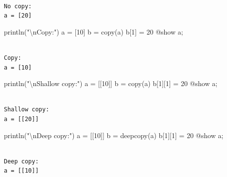\documentclass[
]{article}
\newenvironment{Shaded}{\begin{snugshade}}{\end{snugshade}}
\newcommand{\FloatTok}[1]{\textcolor[rgb]{0.68,0.00,0.00}{#1}}
\newcommand{\FunctionTok}[1]{\textcolor[rgb]{0.28,0.35,0.67}{#1}}
\newcommand{\NormalTok}[1]{\textcolor[rgb]{0.00,0.23,0.31}{#1}}
\newcommand{\OperatorTok}[1]{\textcolor[rgb]{0.37,0.37,0.37}{#1}}
\newcommand{\PreprocessorTok}[1]{\textcolor[rgb]{0.68,0.00,0.00}{#1}}
\newcommand{\SpecialCharTok}[1]{\textcolor[rgb]{0.37,0.37,0.37}{#1}}
\newcommand{\StringTok}[1]{\textcolor[rgb]{0.13,0.47,0.30}{#1}}
\begin{document}
\begin{verbatim}

No copy:
a = [20]
\end{verbatim}

\begin{Shaded}
\begin{Highlighting}[]
\FunctionTok{println}\NormalTok{(}\StringTok{"}\SpecialCharTok{\textbackslash{}n}\StringTok{Copy:"}\NormalTok{)}
\NormalTok{a }\OperatorTok{=}\NormalTok{ [}\FloatTok{10}\NormalTok{]}
\NormalTok{b }\OperatorTok{=} \FunctionTok{copy}\NormalTok{(a)}
\NormalTok{b[}\FloatTok{1}\NormalTok{] }\OperatorTok{=} \FloatTok{20}
\PreprocessorTok{@show}\NormalTok{ a;}
\end{Highlighting}
\end{Shaded}

\begin{verbatim}

Copy:
a = [10]
\end{verbatim}

\begin{Shaded}
\begin{Highlighting}[]
\FunctionTok{println}\NormalTok{(}\StringTok{"}\SpecialCharTok{\textbackslash{}n}\StringTok{Shallow copy:"}\NormalTok{)}
\NormalTok{a }\OperatorTok{=}\NormalTok{ [[}\FloatTok{10}\NormalTok{]]}
\NormalTok{b }\OperatorTok{=} \FunctionTok{copy}\NormalTok{(a)}
\NormalTok{b[}\FloatTok{1}\NormalTok{][}\FloatTok{1}\NormalTok{] }\OperatorTok{=} \FloatTok{20}
\PreprocessorTok{@show}\NormalTok{ a;}
\end{Highlighting}
\end{Shaded}

\begin{verbatim}

Shallow copy:
a = [[20]]
\end{verbatim}

\begin{Shaded}
\begin{Highlighting}[]
\FunctionTok{println}\NormalTok{(}\StringTok{"}\SpecialCharTok{\textbackslash{}n}\StringTok{Deep copy:"}\NormalTok{)}
\NormalTok{a }\OperatorTok{=}\NormalTok{ [[}\FloatTok{10}\NormalTok{]]}
\NormalTok{b }\OperatorTok{=} \FunctionTok{deepcopy}\NormalTok{(a)}
\NormalTok{b[}\FloatTok{1}\NormalTok{][}\FloatTok{1}\NormalTok{] }\OperatorTok{=} \FloatTok{20}
\PreprocessorTok{@show}\NormalTok{ a;}
\end{Highlighting}
\end{Shaded}

\begin{verbatim}

Deep copy:
a = [[10]]
\end{verbatim}
\end{document}
